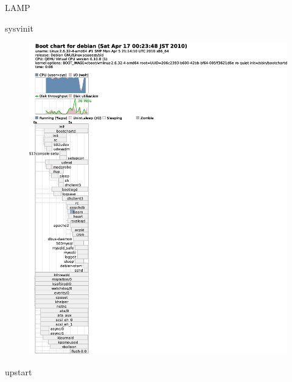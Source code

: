 \begin{frame}{LAMP}
\begin{minipage}[t]{0.48\hsize}
sysvinit
\begin{figure}[h]
\begin{center}
\includegraphics[width=1.0\hsize]{image201004/upstart/sysvinit-lamp-bootchart.eps}
\end{center}
\end{figure}
\end{minipage}
\begin{minipage}[t]{0.48\hsize}
upstart
\begin{figure}[h]
\begin{center}

\end{center}
\end{figure}
\end{minipage}
\end{frame}
